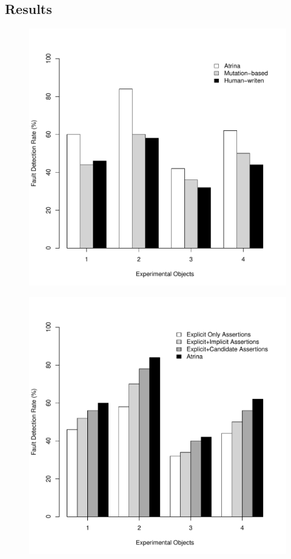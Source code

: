 \subsection{Results} \label{Sec:results}
\begin{figure}[!t]
  \centering
  \includegraphics[width=1\hsize]{r-scripts/barplot-faultDetectionRate}
  \vspace{-0.1in} 
  \label{Fig:faultDetectionRate}
  \vspace{-0.1in} 
\end{figure}

\begin{figure}[!t]
  \centering
  \includegraphics[width=1\hsize]{r-scripts/assertionTypeFaultDetec}
  \vspace{-0.1in} 
  \label{Fig:assertionTypeFaultDetec}
  \vspace{-0.1in} 
\end{figure}